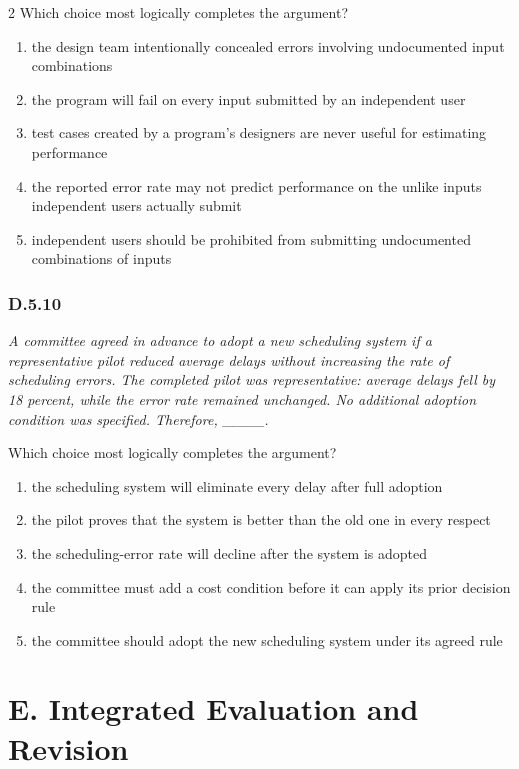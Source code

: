 \documentclass[10pt]{extarticle}
\newcommand{\choice}[1]{\item #1}
\newcommand{\bankitem}[1]{\subsubsection*{#1}}
\begin{document}
\begin{multicols}{2}
Which choice most logically completes the argument?
\begin{enumerate}[label=(\alph*)]
  \choice{the design team intentionally concealed errors involving undocumented input combinations}
  \choice{the program will fail on every input submitted by an independent user}
  \choice{test cases created by a program's designers are never useful for estimating performance}
  \choice{the reported error rate may not predict performance on the unlike inputs independent users actually submit}
  \choice{independent users should be prohibited from submitting undocumented combinations of inputs}
\end{enumerate}
\bankitem{D.5.10}
\emph{A committee agreed in advance to adopt a new scheduling system if a representative pilot reduced average delays without increasing the rate of scheduling errors. The completed pilot was representative: average delays fell by 18 percent, while the error rate remained unchanged. No additional adoption condition was specified. Therefore, \_\_\_\_.}

Which choice most logically completes the argument?
\begin{enumerate}[label=(\alph*)]
  \choice{the scheduling system will eliminate every delay after full adoption}
  \choice{the pilot proves that the system is better than the old one in every respect}
  \choice{the scheduling-error rate will decline after the system is adopted}
  \choice{the committee must add a cost condition before it can apply its prior decision rule}
  \choice{the committee should adopt the new scheduling system under its agreed rule}
\end{enumerate}
\section*{E. Integrated Evaluation and Revision}

\end{multicols}
\end{document}
